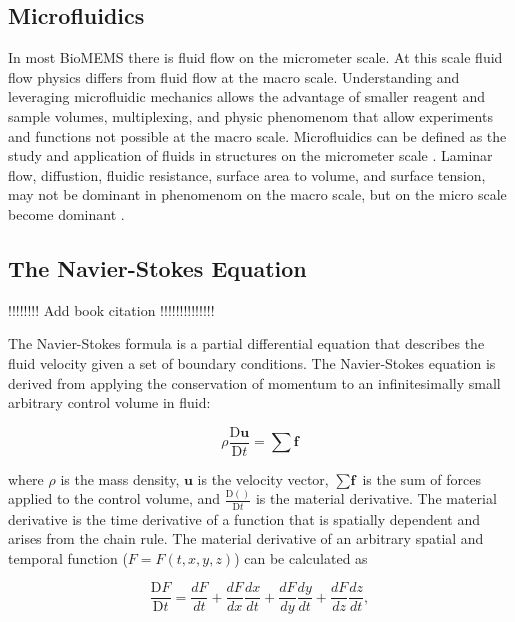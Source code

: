  
 \subsection{Microfluidics}
 
\par In most BioMEMS there is fluid flow on the micrometer scale. At this scale fluid flow physics differs from fluid flow at the macro scale. Understanding and leveraging microfluidic mechanics allows the advantage of smaller reagent and sample volumes, multiplexing, and physic phenomenom that allow experiments and functions not possible at the macro scale. Microfluidics can be defined as the study and application of fluids in structures on the micrometer scale \cite{pamb}. Laminar flow, diffustion, fluidic resistance, surface area to volume, and surface tension, may not be dominant in phenomenom on the macro scale, but on the micro scale become dominant \cite{pamb-12}. 

\subsection*{The Navier-Stokes Equation}

\par !!!!!!!! Add book citation !!!!!!!!!!!!!!

\par The Navier-Stokes formula is a partial differential equation that describes the fluid velocity given a set of boundary conditions. The Navier-Stokes equation is derived from applying the conservation of momentum to an infinitesimally small arbitrary control volume in fluid:

\begin{equation}
    \rho \frac{\text{D}\textbf{u}}{\text{D}t} = \sum \textbf{f}
    \label{eqn:cons_momentum}
\end{equation}

\noindent where $\rho$ is the mass density, $\textbf{u}$ is the velocity vector, $\sum \textbf{f}$ is the sum of forces applied to the control volume, and $\frac{\text{D}()}{\text{D}t}$ is the material derivative. The material derivative is the time derivative of a function that is spatially dependent and arises from the chain rule. The material derivative of an arbitrary spatial and temporal function ($F = F(t,x,y,z)$) can be calculated as

\begin{equation}
    \frac{\text{D}F}{\text{D}t} = \frac{dF}{dt} + \frac{dF}{dx}\frac{dx}{dt} + \frac{dF}{dy}\frac{dy}{dt} + \frac{dF}{dz}\frac{dz}{dt},
\end{equation}

